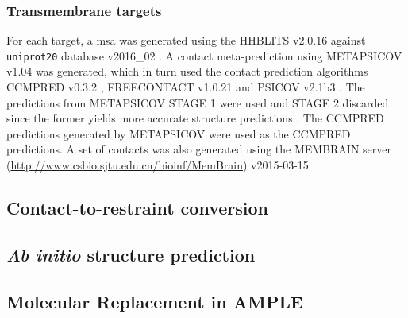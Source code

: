\subsubsection{Transmembrane targets}
For each target, a \gls{msa} was generated using the HHBLITS v2.0.16 \cite{Remmert2011-kt} against \texttt{uniprot20} database v2016\_02 \cite{Bateman2017-pb}. A contact meta-prediction using METAPSICOV v1.04 \cite{Jones2015-vq} was generated, which in turn used the contact prediction algorithms CCMPRED v0.3.2 \cite{Seemayer2014-zp}, FREECONTACT v1.0.21 \cite{Kajan2014-bx} and PSICOV v2.1b3 \cite{Jones2012-ks}. The predictions from METAPSICOV STAGE 1 were used and STAGE 2 discarded since the former yields more accurate structure predictions \cite{Jones2015-vq}. The CCMPRED predictions generated by METAPSICOV were used as the CCMPRED predictions. A set of contacts was also generated using the MEMBRAIN server (\href{http://www.csbio.sjtu.edu.cn/bioinf/MemBrain}{http://www.csbio.sjtu.edu.cn/bioinf/MemBrain}) v2015-03-15 \cite{Yang2013-bf}.

\subsection{Contact-to-restraint conversion}
\subsection{\textit{Ab initio} structure prediction}
\subsection{Molecular Replacement in AMPLE}
